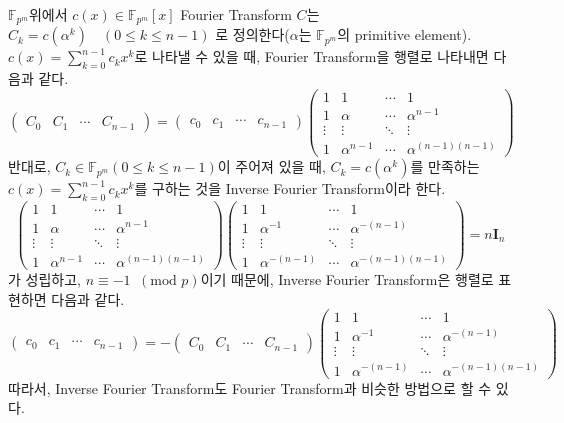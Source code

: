 \documentclass[11pt]{article}
\begin{document}
$\mathbb{F}_{p^{m}}$위에서 $c(x)\in\mathbb{F}_{p^{m}}[x]$ Fourier Transform $C$는 $C_{k}=c(\alpha^{k})\quad(0\leq k\leq n-1)$ 로 정의한다($\alpha$는 $\mathbb{F}_{p^{m}}$의 primitive element). $c(x)=\sum_{k=0}^{n-1}c_{k}x^{k}$로 나타낼 수 있을 때, Fourier Transform을 행렬로 나타내면 다음과 같다.\\
\begin{displaymath}
 \begin{pmatrix}C_{0}&C_{1}&\cdots&C_{n-1}\end{pmatrix}=
\begin{pmatrix}c_{0}&c_{1}&\cdots&c_{n-1}\end{pmatrix}
 \begin{pmatrix}1&1&\cdots&1\\1&\alpha&\cdots&\alpha^{n-1}\\ \vdots&\vdots&\ddots&\vdots\\1&\alpha^{n-1}&\cdots&\alpha^{(n-1)(n-1)}\end{pmatrix}
\end{displaymath}
반대로, $C_{k}\in\mathbb{F}_{p^{m}}(0\leq k\leq n-1)$이 주어져 있을 때, $C_{k}=c(\alpha^{k})$를 만족하는 $c(x)=\sum_{k=0}^{n-1}c_{k}x^{k}$를 구하는 것을 Inverse Fourier Transform이라 한다.
\begin{displaymath}
 \begin{pmatrix}1&1&\cdots&1\\1&\alpha&\cdots&\alpha^{n-1}\\ \vdots&\vdots&\ddots&\vdots\\1&\alpha^{n-1}&\cdots&\alpha^{(n-1)(n-1)}\end{pmatrix}
 \begin{pmatrix}1&1&\cdots&1\\1&\alpha^{-1}&\cdots&\alpha^{-(n-1)}\\ \vdots&\vdots&\ddots&\vdots\\1&\alpha^{-(n-1)}&\cdots&\alpha^{-(n-1)(n-1)}\end{pmatrix}
 =n\mathbf{I}_{n}
\end{displaymath}
가 성립하고, $n\equiv-1\phantom{a}(\textrm{mod } p)$이기 때문에, Inverse Fourier Transform은 행렬로 표현하면 다음과 같다.
\begin{displaymath}
\begin{pmatrix}c_{0}&c_{1}&\cdots&c_{n-1}\end{pmatrix}=
 -\begin{pmatrix}C_{0}&C_{1}&\cdots&C_{n-1}\end{pmatrix}
 \begin{pmatrix}1&1&\cdots&1\\1&\alpha^{-1}&\cdots&\alpha^{-(n-1)}\\ \vdots&\vdots&\ddots&\vdots\\1&\alpha^{-(n-1)}&\cdots&\alpha^{-(n-1)(n-1)}\end{pmatrix}
\end{displaymath}
따라서, Inverse Fourier Transform도 Fourier Transform과 비슷한 방법으로 할 수 있다.
\end{document}
